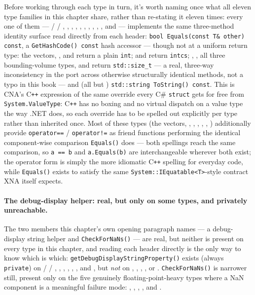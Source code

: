 Before working through each type in turn, it's worth naming once what all eleven type
families in this chapter share, rather than re-stating it eleven times: every one of them ---
 /  / , ,
, , , ,
, , ,
, and  --- implements the same three-method
identity surface read directly from each header: \texttt{bool Equals(const T\& other) const},
a \texttt{GetHashCode() const} hash accessor --- though not at a uniform return type: the
vectors, , and  return a plain \texttt{int};
 and  return \texttt{intcs}; ,
, all three bounding-volume types, and  return
\texttt{std::size\_t} --- a real, three-way inconsistency in the port across otherwise
structurally identical methods, not a typo in this book --- and (all but )
\texttt{std::string ToString() const}. This is CNA's C\texttt{++}
expression of the same override every C\# \texttt{struct} gets for free from
\texttt{System.ValueType}: C\texttt{++} has no boxing and no virtual dispatch on a value type
the way .NET does, so each override has to be spelled out explicitly per type rather than
inherited once. Most of these types (the vectors, , ,
, , , ) additionally provide
\texttt{operator==} / \texttt{operator!=} as friend functions performing the identical
component-wise comparison \texttt{Equals()} does --- both spellings reach the same comparison,
so \texttt{a == b} and \texttt{a.Equals(b)} are interchangeable wherever both exist; the
operator form is simply the more idiomatic C\texttt{++} spelling for everyday code, while
\texttt{Equals()} exists to satisfy the same \texttt{System::IEquatable<T>}-style contract XNA
itself expects.

\paragraph{The debug-display helper: real, but only on some types, and privately unreachable.}
The two members this chapter's own opening paragraph names --- a debug-display string helper
and \texttt{CheckForNaNs()} --- are real, but neither is present on every type in this chapter,
and reading each header directly is the only way to know which is which:
\texttt{getDebugDisplayStringProperty()} exists (always \texttt{private}) on
 /  / , ,
, , , , and
, but \emph{not} on , ,
, , or . \texttt{CheckForNaNs()} is
narrower still, present only on the five genuinely floating-point-heavy types where a NaN
component is a meaningful failure mode: , ,
, , and .

